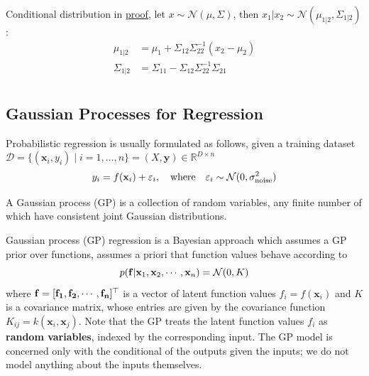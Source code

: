 \documentclass[10pt]{elegantbook}
\begin{document}
Conditional distribution in \href{https://statproofbook.github.io/P/mvn-cond.html}{proof}, let $x \sim \mathcal N(\mu, \Sigma)$, then $x_1 | x_2 
\sim \mathcal N(\mu_{1 | 2}, \Sigma_{1 | 2})$:
\begin{equation}
    \begin{aligned}
        \mu_{1 | 2} &= \mu_1 + \Sigma_{12} \Sigma_{22}^{-1} (x_2 - \mu_2) \\
        \Sigma_{1 | 2} &= \Sigma_{11} - \Sigma_{12} \Sigma_{22}^{-1} \Sigma_{21} \\
    \end{aligned}
\end{equation}

\subsection{Gaussian Processes for Regression}

Probabilistic regression is usually formulated as follows, given a training dataset 
$\mathcal{D}=\{( \mathbf{x}_{i}, y_{i} ) \mid i=1, \ldots, n \} = (X, \mathbf y) \in \mathbb R^{D \times n}$
\begin{equation}
    y_{i}=f({\bf x}_{i})+\varepsilon_{i},\quad\mathrm{where}\quad\varepsilon_{i}\sim{\mathcal N}(0,\sigma_{\mathrm{noise}}^{2})
\end{equation}

\begin{definition} \label{def:gaussian_process}
    A Gaussian process (GP) is a collection of random variables, any finite number of
which have consistent joint Gaussian distributions.
\end{definition}

Gaussian process (GP) regression is a Bayesian approach which assumes a GP prior over functions, assumes a priori that function values behave according to
\begin{equation}
    p({\bf f}|{\bf x}_{1},{\bf x}_{2},\cdots,{\bf x}_{n})=\mathcal{N}(0,K)
\end{equation}
where $\bf f = [f_1, f_2, \cdots, f_n]^{\top}$ is a vector of latent function values $f_i = f(\mathbf{x}_i)$ and $K$ is a covariance matrix, whose entries are given by 
the covariance function $K_{ij} = k(\mathbf{x}_i, \mathbf{x}_j)$. Note that the GP treats the
latent function values $f_i$ as \textbf{random variables}, indexed by the corresponding input. The GP model is concerned only
with the conditional of the outputs given the inputs; we do not model anything about the inputs
themselves.
\end{document}
